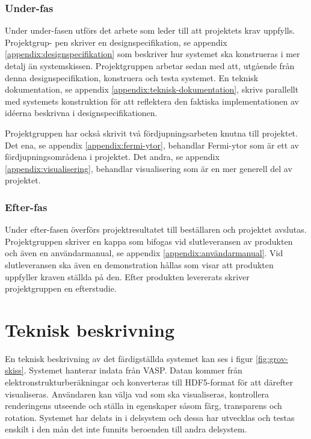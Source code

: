 \documentclass[a4paper,12pt]{article}
\begin{document}
\subsubsection{Under-fas}
Under  under-fasen  utförs  det  arbete  som  leder  till  att  projektets  krav  uppfylls.  Projektgrup-
pen skriver en designspecifikation, se appendix \ref{appendix:designspecifikation}
som beskriver hur systemet ska konstrueras i mer detalj än
systemskissen. Projektgruppen arbetar sedan med att, utgående från denna designspecifikation, konstruera och testa systemet. En teknisk dokumentation, se appendix \ref{appendix:teknisk-dokumentation}, skrivs parallellt med systemets konstruktion för att reflektera den faktiska implementationen av idéerna beskrivna i designspecifikationen. 

Projektgruppen har också skrivit två fördjupningsarbeten knutna till projektet. Det ena, se appendix \ref{appendix:fermi-ytor}, behandlar Fermi-ytor som är ett av fördjupningsområdena i projektet. Det andra, se appendix \ref{appendix:visualisering}, behandlar visualisering som är en mer generell del av projektet. 

\subsubsection{Efter-fas}
Under efter-fasen överförs projektresultatet till beställaren och projektet avslutas. Projektgruppen skriver en kappa som bifogas vid slutleveransen av produkten och även en användarmanual, se appendix \ref{appendix:användarmanual}. Vid slutleveransen ska
även en demonstration hållas som visar att produkten uppfyller kraven ställda på den. Efter produkten levererats skriver projektgruppen en efterstudie.

\section{Teknisk beskrivning}

En teknisk beskrivning av det  färdigställda systemet kan ses i figur \ref{fig:grov-skiss}. %
Systemet hanterar indata från VASP. %
Datan kommer från elektronstrukturberäkningar och konverteras till HDF5-format för att därefter visualiseras. Användaren kan välja vad som ska visualiseras, kontrollera renderingens utseende och ställa in egenskaper såsom färg, transparens och rotation.
Systemet har delats in i delsystem och dessa har utvecklas och testas enskilt i den mån det inte funnits beroenden till andra delsystem.
\end{document}
